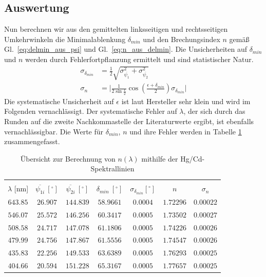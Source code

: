 \documentclass[12pt,a4paper]{article}
\begin{document}
\subsection{Auswertung}
Nun berechnen wir aus den gemittelten linksseitigen und rechtsseitigen Umkehrwinkeln die Minimalablenkung $\delta_{min}$ und den Brechungsindex $n$ gemäß Gl.~\eqref{eq:delmin_aus_psi} und Gl.~\eqref{eq:n_aus_delmin}. Die Unsicherheiten auf $\delta_{min}$ und $n$ werden durch Fehlerfortpflanzung ermittelt und sind statistischer Natur.
\begin{align}
\sigma_{\delta_{min}}&=\frac{1}{2}\sqrt{\sigma_{\overline{\psi_1}}^2+\sigma_{\overline{\psi_2}}^2}\\
\sigma_n&=\Big|\frac{1}{2\sin{\frac{\epsilon}{2}}}\cos{\left(\frac{\epsilon+\delta_{min}}{2}\right)}\sigma_{\delta_{min}}\Big|
\end{align}
Die systematische Unsicherheit auf $\epsilon$ ist laut Hersteller sehr klein und wird im Folgenden vernachlässigt. Der systematische Fehler auf $\lambda$, der sich durch das Runden auf die zweite Nachkommastelle der Literaturwerte ergibt, ist ebenfalls vernachlässigbar. Die Werte für  $\delta_{min}$, $n$ und ihre Fehler werden in Tabelle \ref{table:CdHg_Rechnung} zusammengefasst.\\
\begin{table}[H]
	\centering
	\begin{tabular}{|c|c|c|c|c|c|c|}
		\hline
		&&&&&&\\
		$\lambda$ [nm]&$\overline{\psi_{1i}}\ [^{\circ}]$&$\overline{\psi_{2i}}\ [^{\circ}]$&$\delta_{min}\ [^{\circ}]$&$\sigma_{\delta_{min}}[^{\circ}]$& $n$ & $\sigma_{n}$\\
		\hline
		$643.85$&$26.907$&$144.839$&$58.9661$&$0.0004$&$1.72296$&$0.00022$\\
		$546.07$&$25.572$&$146.256$&$60.3417$&$0.0005$&$1.73502$&$0.00027$\\
		$508.58$&$24.717$&$147.078$&$61.1806$&$0.0005$&$1.74226$&$0.00026$\\
		$479.99$&$24.756$&$147.867$&$61.5556$&$0.0005$&$1.74547$&$0.00026$\\
		$435.83$&$22.256$&$149.533$&$63.6389$&$0.0005$&$1.76293$&$0.00025$\\
		$404.66$&$20.594$&$151.228$&$65.3167$&$0.0005$&$1.77657$&$0.00025$\\
		\hline
	\end{tabular}
	\caption{Übersicht zur Berechnung von $n(\lambda)$ mithilfe der Hg/Cd-Spektrallinien}
	\label{table:CdHg_Rechnung}
\end{table}
\end{document}
